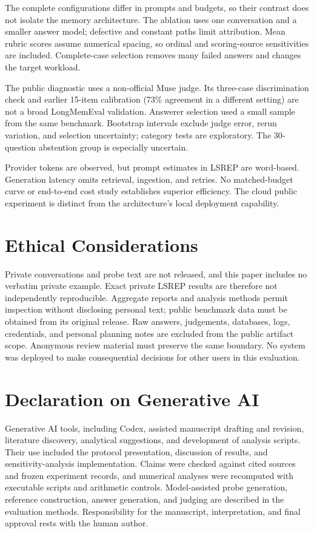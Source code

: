 \documentclass[11pt]{article}
\begin{document}
The complete configurations differ in prompts and budgets, so their contrast does not isolate the memory architecture. The ablation uses one conversation and a smaller answer model; defective and constant paths limit attribution. Mean rubric scores assume numerical spacing, so ordinal and scoring-source sensitivities are included. Complete-case selection removes many failed answers and changes the target workload.

The public diagnostic uses a non-official Muse judge. Its three-case discrimination check and earlier 15-item calibration (73\% agreement in a different setting) are not a broad LongMemEval validation. Answerer selection used a small sample from the same benchmark. Bootstrap intervals exclude judge error, rerun variation, and selection uncertainty; category tests are exploratory. The 30-question abstention group is especially uncertain.

Provider tokens are observed, but prompt estimates in LSREP are word-based. Generation latency omits retrieval, ingestion, and retries. No matched-budget curve or end-to-end cost study establishes superior efficiency. The cloud public experiment is distinct from the architecture's local deployment capability.

\section*{Ethical Considerations}
Private conversations and probe text are not released, and this paper includes no verbatim private example. Exact private LSREP results are therefore not independently reproducible. Aggregate reports and analysis methods permit inspection without disclosing personal text; public benchmark data must be obtained from its original release. Raw answers, judgements, databases, logs, credentials, and personal planning notes are excluded from the public artifact scope. Anonymous review material must preserve the same boundary. No system was deployed to make consequential decisions for other users in this evaluation.

\section*{Declaration on Generative AI}
Generative AI tools, including Codex, assisted manuscript drafting and revision, literature discovery, analytical suggestions, and development of analysis scripts. Their use included the protocol presentation, discussion of results, and sensitivity-analysis implementation. Claims were checked against cited sources and frozen experiment records, and numerical analyses were recomputed with executable scripts and arithmetic controls. Model-assisted probe generation, reference construction, answer generation, and judging are described in the evaluation methods. Responsibility for the manuscript, interpretation, and final approval rests with the human author.
\end{document}

